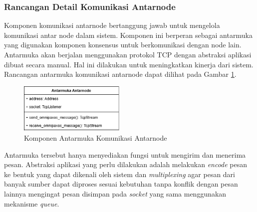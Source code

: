 \subsubsection{Rancangan Detail Komunikasi Antarnode}
\label{subsubsection:detail-komponen-internode-interface}

Komponen komunikasi antarnode bertanggung jawab untuk mengelola komunikasi antar node dalam sistem. Komponen ini berperan sebagai antarmuka yang digunakan komponen konsensus untuk berkomunikasi dengan node lain. Antarmuka akan berjalan menggunakan protokol TCP dengan abstraksi aplikasi dibuat secara manual. Hal ini dilakukan untuk meningkatkan kinerja dari sistem. Rancangan antarmuka komunikasi antarnode dapat dilihat pada Gambar \ref{fig:internode-interface-component}.

\begin{figure}[ht]
    \centering
    \includegraphics[width=0.45\textwidth]{resources/chapter-3/internode-interface-component.png}
    \caption{Komponen Antarmuka Komunikasi Antarnode}
    \label{fig:internode-interface-component}
\end{figure}

Antarmuka tersebut hanya menyediakan fungsi untuk mengirim dan menerima pesan. Abstraksi aplikasi yang perlu dilakukan adalah melakukan \textit{encode} pesan ke bentuk yang dapat dikenali oleh sistem dan \textit{multiplexing} agar pesan dari banyak sumber dapat diproses sesuai kebutuhan tanpa konflik dengan pesan lainnya mengingat pesan disimpan pada \textit{socket} yang sama menggunakan mekanisme \textit{queue}.